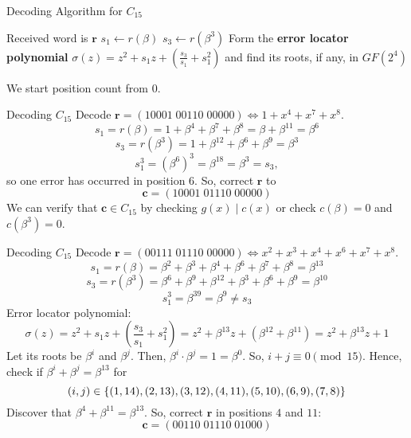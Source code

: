 \begin{algorithm}
    \DontPrintSemicolon{}
    \caption{Decoding Algorithm for $ C_{15} $}
    Received word is $ \symbf{r} $\;
    $ s_1\gets r(\beta) $\;
    $ s_3\gets r(\beta^3) $\;
     {
    }
     {
     {
    }
    }
     {
        \Return{}
    }
    Form the \textbf{error locator polynomial}
    $ \sigma(z)=z^2+s_1z+\left( \frac{s_3}{s_1} +s_1^2 \right) $ and find its
    roots, if any, in $ GF(2^4) $\;
     {
    }
    \Return{}
\end{algorithm}

\begin{Remark}{}{}
    We start position count from $ 0 $.
\end{Remark}


\begin{Example}{Decoding $ C_{15} $}{}
    Decode $ \symbf{r}=(10001\; 00110\; 00000)\iff 1+x^4+x^7+x^8 $.
    \[ s_1=r(\beta)=1+\beta^4+\beta^7+\beta^8=\beta+\beta^{11}=\beta^6 \]
    \[ s_3=r(\beta^3)=1+\beta^{12}+\beta^{6}+\beta^9=\beta^3 \]
    \[ s_1^3=(\beta^6)^3=\beta^{18}=\beta^3=s_3, \]
    so one error has occurred in position $ 6 $. So, correct $ \symbf{r} $ to
    \[ \symbf{c}=(10001\; 01110\; 00000) \]
    We can verify that $ \symbf{c}\in C_{15} $ by checking $ g(x)\mid c(x) $
    or check $ c(\beta)=0 $ and $ c(\beta^3)=0 $.
\end{Example}



\begin{Example}{Decoding $ C_{15} $}{}
    Decode $ \symbf{r}=(00111\; 01110\; 00000)\iff x^2+x^3+x^4+x^6+x^7+x^8 $.
    \[ s_1=r(\beta)=\beta^2+\beta^3+\beta^4+\beta^6+\beta^7+\beta^8=\beta^{13} \]
    \[ s_3=r(\beta^3)=\beta^6+\beta^9+\beta^{12}+\beta^3+\beta^6+\beta^9=\beta^{10} \]
    \[ s_1^3=\beta^{39}=\beta^9\neq s_3 \]
    Error locator polynomial:
    \[ \sigma(z)=z^2+s_1z+\left(\frac{s_3}{s_1}+s_1^2 \right)
        =z^2+\beta^{13}z+(\beta^{12}+\beta^{11})=z^2+\beta^{13}z+1 \]
    Let its roots be $ \beta^i $ and $ \beta^j $. Then, $ \beta^i\cdot \beta^j=1=
        \beta^0 $. So, $ i+j\equiv 0\pmod{15} $. Hence, check if $ \beta^i+\beta^j=\beta^{13} $
    for
    \[ (i,j)\in \{(1,14),(2,13),(3,12),(4,11),(5,10),(6,9),(7,8)\} \]
    Discover that $ \beta^4+\beta^{11}=\beta^{13} $. So, correct $ \symbf{r} $
    in positions $ 4 $ and $ 11 $:
    \[ \symbf{c}=(00110\; 01110\; 01000) \]
\end{Example}



